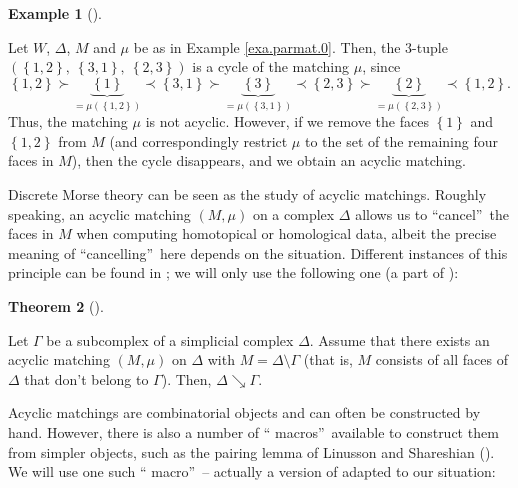 \documentclass[numbers=enddot,12pt,final,onecolumn,notitlepage]{scrartcl}%
\theoremstyle{definition}
\newtheorem{theo}{Theorem}[section]
\newenvironment{theorem}[1][]
{\begin{theo}[#1]\begin{leftbar}}
{\end{leftbar}\end{theo}}
\newtheorem{exam}[theo]{Example}
\newenvironment{example}[1][]
{\begin{exam}[#1]\begin{leftbar}}
{\end{leftbar}\end{exam}}
\begin{document}
\begin{example}
Let $W$, $\Delta$, $M$ and $\mu$ be as in Example \ref{exa.parmat.0}. Then,
the $3$-tuple $\left(  \left\{  1,2\right\}  ,\ \left\{  3,1\right\}
,\ \left\{  2,3\right\}  \right)  $ is a cycle of the matching $\mu$, since%
\[
\left\{  1,2\right\}  \succ\underbrace{\left\{  1\right\}  }_{=\mu\left(
\left\{  1,2\right\}  \right)  }\prec\left\{  3,1\right\}  \succ
\underbrace{\left\{  3\right\}  }_{=\mu\left(  \left\{  3,1\right\}  \right)
}\prec\left\{  2,3\right\}  \succ\underbrace{\left\{  2\right\}  }%
_{=\mu\left(  \left\{  2,3\right\}  \right)  }\prec\left\{  1,2\right\}  .
\]
Thus, the matching $\mu$ is not acyclic. However, if we remove the faces
$\left\{  1\right\}  $ and $\left\{  1,2\right\}  $ from $M$ (and
correspondingly restrict $\mu$ to the set of the remaining four faces in $M$),
then the cycle disappears, and we obtain an acyclic matching.
\end{example}

Discrete Morse theory can be seen as the study of acyclic matchings. Roughly
speaking, an acyclic matching $\left(  M,\mu\right)  $ on a complex $\Delta$
allows us to \textquotedblleft cancel\textquotedblright\ the faces in $M$ when
computing homotopical or homological data, albeit the precise meaning of
\textquotedblleft cancelling\textquotedblright\ here depends on the situation.
Different instances of this principle can be found in \cite[Chapters 10, 11,
12, 13]{Kozlov20}; we will only use the following one (a part of \cite[Theorem
10.9]{Kozlov20}):

\begin{theorem}
\label{thm.dmt.collapse}Let $\Gamma$ be a subcomplex of a simplicial complex
$\Delta$. Assume that there exists an acyclic matching $\left(  M,\mu\right)
$ on $\Delta$ with $M=\Delta\setminus\Gamma$ (that is, $M$ consists of all
faces of $\Delta$ that don't belong to $\Gamma$). Then, $\Delta\searrow\Gamma$.
\end{theorem}

Acyclic matchings are combinatorial objects and can often be constructed by
hand. However, there is also a number of \textquotedblleft
macros\textquotedblright\ available to construct them from simpler objects,
such as the pairing lemma of Linusson and Shareshian (\cite[Lemma
3.4]{LinSha03}). We will use one such \textquotedblleft
macro\textquotedblright\ -- actually a version of \cite[Lemma 3.4]{LinSha03}
adapted to our situation:
\end{document}
